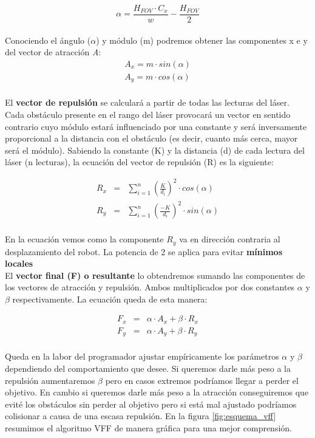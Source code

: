 \begin{equation*}
\alpha = \frac{H_{FOV} \cdot C_{x}}{w} - \frac{H_{FOV}}{2}
\end{equation*}\\

Conociendo el ángulo ($\alpha$) y módulo (m) podremos obtener las componentes x e y del vector de atracción \textit{A}:
\begin{eqnarray*}
A_x = m \cdot sin(\alpha)\\
A_y = m \cdot cos(\alpha)\\
\end{eqnarray*}

El \textbf{vector de repulsión} se calculará a partir de todas las lecturas del láser. Cada obstáculo presente en el rango del láser provocará un vector en sentido contrario cuyo módulo estará influenciado por una constante y será inversamente proporcional a la distancia con el obstáculo (es decir, cuanto más cerca, mayor será el módulo). Sabiendo la constante (K) y la distancia (d) de cada lectura del láser (n lecturas), la ecuación del vector de repulsión (R) es la siguiente:

\begin{eqnarray*}
R_x &=& \sum_{i=1}^n\left(\frac{K}{d_i}\right)^2 \cdot cos(\alpha)\\
R_y &=& \sum_{i=1}^n\left(\frac{-K}{d_i}\right)^2 \cdot sin(\alpha)\\
\end{eqnarray*}

En la ecuación vemos como la componente $R_y$ va en dirección contraria al desplazamiento del robot. La potencia de 2 se aplica para evitar \textbf{mínimos locales}\\

El \textbf{vector final (F) o resultante} lo obtendremos sumando las componentes de los vectores de atracción y repulsión. Ambos multiplicados por dos constantes $\alpha$ y $\beta$ respectivamente. La ecuación queda de esta manera:

\begin{eqnarray*}
F_x &=& \alpha \cdot A_x + \beta \cdot R_x\\
F_y &=& \alpha \cdot A_y + \beta \cdot R_y\\
\end{eqnarray*}

Queda en la labor del programador ajustar empíricamente los parámetros $\alpha$ y $\beta$ dependiendo del comportamiento que desee. Si queremos darle más peso a la repulsión aumentaremos $\beta$ pero en casos extremos podríamos llegar a perder el objetivo. En cambio si queremos darle más peso a la atracción conseguiremos que evité los obstáculos sin perder al objetivo pero si está mal ajustado podríamos colisionar a causa de una escasa repulsión. En la figura \ref{fig:esquema_vff} resumimos el algoritmo VFF de manera gráfica para una mejor comprensión.\\

